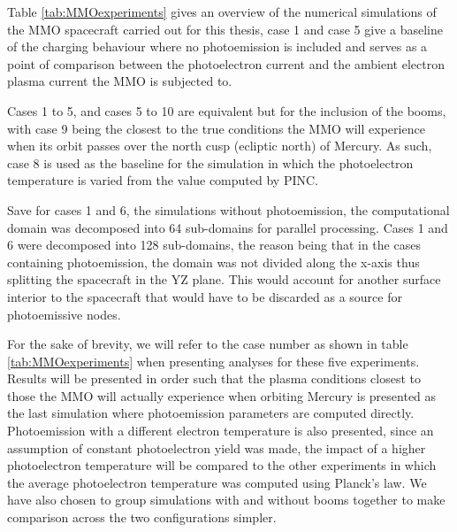 Table \ref{tab:MMOexperiments} gives an overview of the numerical simulations of the MMO spacecraft carried out for this thesis, case 1 and case 5 give a baseline of the charging behaviour where no photoemission is included and serves as a point of comparison between the photoelectron current and the ambient electron plasma current the MMO is subjected to. 

Cases 1 to 5, and cases 5 to 10 are equivalent but for the inclusion of the booms, with case 9 being the closest to the true conditions the MMO will experience when its orbit passes over the north cusp (ecliptic north) of Mercury. As such, case 8 is used as the baseline for the simulation in which the photoelectron temperature is varied from the value computed by PINC.

Save for cases 1 and 6, the simulations without photoemission, the computational domain was decomposed into 64 sub-domains for parallel processing. Cases 1 and 6 were decomposed into 128 sub-domains, the reason being that in the cases containing photoemission, the domain was not divided along the x-axis thus splitting the spacecraft in the YZ plane. This would account for another surface interior to the spacecraft that would have to be discarded as a source for photoemissive nodes.

For the sake of brevity, we will refer to the case number as shown in table \ref{tab:MMOexperiments} when presenting analyses for these five experiments. Results will be presented in order such that the plasma conditions closest to those the MMO will actually experience when orbiting Mercury is presented as the last simulation where photoemission parameters are computed directly. Photoemission with a different electron temperature is also presented, since an assumption of constant photoelectron yield was made, the impact of a higher photoelectron temperature will be compared to the other experiments in which the average photoelectron temperature was computed using Planck's law. We have also chosen to group simulations with and without booms together to make comparison across the two configurations simpler.


